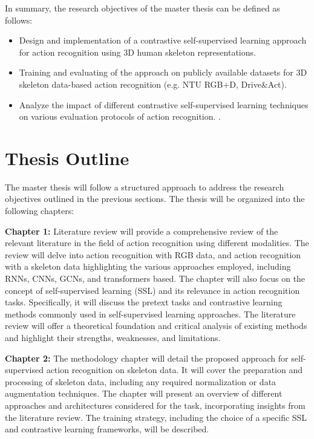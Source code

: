 In summary, the research objectives of the master thesis can be defined as follows:
\begin{itemize}
	\item Design and implementation of a contrastive self-supervised learning approach for action recognition using 3D human skeleton representations.
	\item Training and evaluating of the approach on publicly available datasets for 3D skeleton data-based action recognition (e.g. NTU RGB+D, Drive\&Act).
        \item  Analyze the impact of different contrastive self-supervised learning techniques on various evaluation protocols of action recognition.
.
\end{itemize}


\section{Thesis Outline}
The master thesis will follow a structured approach to address the research objectives outlined in the previous sections. The thesis will be organized into the following chapters:

\textbf{Chapter 1:} Literature review
will provide a comprehensive review of the relevant literature in the field of action recognition using different modalities. The review will delve into action recognition with RGB data, and action recognition with a skeleton data highlighting the various approaches employed, including RNNs, CNNs, GCNs, and transformers based. The chapter will also focus on the concept of self-supervised learning (SSL) and its relevance in action recognition tasks. Specifically, it will discuss the pretext tasks and contrastive learning methods commonly used in self-supervised learning approaches. The literature review will offer a theoretical foundation and critical analysis of existing methods and highlight their strengths, weaknesses, and limitations.

\textbf{Chapter 2:} The methodology chapter will detail the proposed approach for self-supervised action recognition on skeleton data. It will cover the preparation and processing of skeleton data, including any required normalization or data augmentation techniques. The chapter will present an overview of different approaches and architectures considered for the task, incorporating insights from the literature review. The training strategy, including the choice of a specific SSL and contrastive learning frameworks, will be described.

